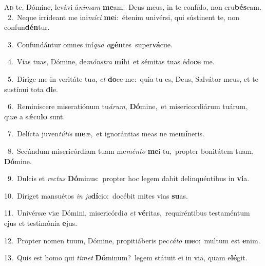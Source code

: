\lettrine{\initial\textcolor{\initialcolor}{A}}{d} te, Dómine, levávi á\-\textit{ni}\-\textit{mam} \textbf{me}\-am:~\star Deus meus, in te confído, non eru\-\textbf{bés}\-cam.\\
{\numbfont\textcolor{\numbcolor}{~2.}}~Neque irrídeant me ini\-\textit{mí}\-\textit{ci} \textbf{me}\-i:~\star étenim univérsi, qui sústinent te, non confun\-\textbf{dén}\-tur.\par
{\numbfont\textcolor{\numbcolor}{~3.}}~Confundántur omnes iní\textit{qua} \textit{a}\-\textbf{gén}tes~\star super\-\textbf{vá}\-cue.\par
{\numbfont\textcolor{\numbcolor}{~4.}}~Vias tuas, Dómine, de\-\textit{móns}\-\textit{tra} \textbf{mi}\-hi~\star et sémitas tuas édo\textbf{ce} me.\par
{\numbfont\textcolor{\numbcolor}{~5.}}~Dírige me in veritáte tu\-\textit{a}\-, \textit{et} \textbf{do}\-ce me:~\star quia tu es, Deus, Salvátor meus, et te sustínui tota \textbf{di}\-e.\par
{\numbfont\textcolor{\numbcolor}{~6.}}~Reminíscere miseratiónum tu\-\textit{á}\-\textit{rum}, \textbf{Dó}\-mine,~\star et misericordiárum tuárum, quæ a sǽcu\textbf{lo} sunt.\par
{\numbfont\textcolor{\numbcolor}{~7.}}~Delícta juven\-\textit{tú}\-\textit{tis} \textbf{me}\-æ,~\star et ignorántias meas ne me\-\textbf{mí}\-neris.\par
{\numbfont\textcolor{\numbcolor}{~8.}}~Secúndum misericórdiam tuam me\-\textit{mén}\-\textit{to} \textbf{me}\-i tu,~\star propter bonitátem tuam, \textbf{Dó}\-mine.\par
{\numbfont\textcolor{\numbcolor}{~9.}}~Dulcis et \textit{rec}\-\textit{tus} \textbf{Dó}\-minus:~\star propter hoc legem dabit delinquéntibus in \textbf{vi}\-a.\par
{\numbfont\textcolor{\numbcolor}{10.}}~Díriget mansuétos \textit{in} \textit{ju}\-\textbf{dí}cio:~\star docébit mites vias \textbf{su}\-as.\par
{\numbfont\textcolor{\numbcolor}{11.}}~Univérsæ viæ Dómini, misericórdi\textit{a} \textit{et} \textbf{vé}\-ritas,~\star requiréntibus testaméntum ejus et testimónia \textbf{e}\-jus.\par
{\numbfont\textcolor{\numbcolor}{12.}}~Propter nomen tuum, Dómine, propitiáberis pec\-\textit{cá}\-\textit{to} \textbf{me}\-o:~\star multum est \textbf{e}\-nim.\par
{\numbfont\textcolor{\numbcolor}{13.}}~Quis est homo qui \textit{ti}\-\textit{met} \textbf{Dó}\-minum?~\star legem státuit ei in via, quam e\-\textbf{lé}\-git.\par
